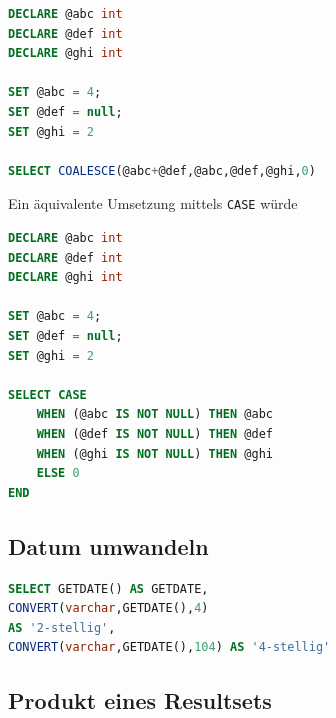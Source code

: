 \documentclass[12pt,ngerman,a4paper,index=totoc,twoside]{scrartcl}
\newcommand{\sql}[1]{\texttt{#1}}
\newcommand{\lwidth}{0.75}
\begin{document}
\begin{center}
\begin{minipage}{\lwidth\textwidth}
\begin{lstlisting}[language={SQL},caption={\sql{COALESCE}  Beispiel},label={coalesce:coalesce1}]
DECLARE @abc int
DECLARE @def int
DECLARE @ghi int

SET @abc = 4;
SET @def = null;
SET @ghi = 2

SELECT COALESCE(@abc+@def,@abc,@def,@ghi,0) 
\end{lstlisting}
\end{minipage}
\end{center}

Ein äquivalente Umsetzung mittels \sql{CASE} würde 

\begin{center}
\begin{minipage}{\lwidth\textwidth}
\begin{lstlisting}[language={SQL},caption={\sql{COALESCE} Beispiel mittels \sql{CASE}},label={coalesce:coalesce2}]
DECLARE @abc int
DECLARE @def int
DECLARE @ghi int

SET @abc = 4;
SET @def = null;
SET @ghi = 2

SELECT CASE
	WHEN (@abc IS NOT NULL) THEN @abc
	WHEN (@def IS NOT NULL) THEN @def
	WHEN (@ghi IS NOT NULL) THEN @ghi
	ELSE 0
END			
\end{lstlisting}
\end{minipage}
\end{center} 


\subsection{Datum umwandeln}

\begin{center}
\begin{minipage}{\lwidth\textwidth}
\begin{lstlisting}[language={SQL},caption={},label={tricks:date1}]
SELECT GETDATE() AS GETDATE, 
CONVERT(varchar,GETDATE(),4)
AS '2-stellig', 
CONVERT(varchar,GETDATE(),104) AS '4-stellig'
\end{lstlisting}
\end{minipage}
\end{center}

\subsection{Produkt eines Resultsets}\label{trick:produkt}
\end{document}
